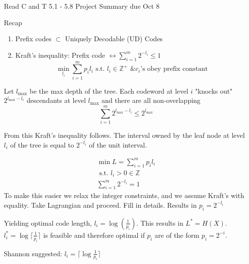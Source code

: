 

Read C and T 5.1 - 5.8
\noindent
Project Summary due Oct 8

\begin{rmk}{Recap}{}
\begin{enumerate}
    \item Prefix codes \(\subset \) Uniquely Decodable (UD) Codes
    \item Kraft's inequality: Prefix code \(\leftrightarrow \sum_{i = 1}^{m} 2^{- l_{i} }\leq 1\)
    \[
        \min _{l_{i} }\sum_{i = 1}^m p_{i} l_{i} \text{ s.t. } l_{i} \in \mathbb{Z}^+ \text{ \& } c_{i}\text{'s obey prefix constant} 
    \]
\end{enumerate}
\end{rmk}

Let \(l_{\mathrm{max} } \) be the max depth of the tree. Each codeword at level \(i\) "knocks out" \(2^{l_{\mathrm{max} } - l_{i} }\) descendants at level \(l_{\mathrm{max} } \) and there are all non-overlapping
\[
    \sum_{i = 1}^{m} 2^{l_{\mathrm{max} } - l_{i}  } \leq 2^{l_{\mathrm{max} } }
\]

From this Kraft's inequality follows. The interval owned by the leaf node at level \(l_{i}  \) of the tree is equal to \(2^{- l_{i} } \) of the unit interval. 



\begin{misc}{}{}
\begin{align*}
    \min  L = \sum_{i = 1}^{m} p _{i} l_{i} \\ \text{ s.t. } l_{i} > 0 \in \mathbb{Z} \\
    \sum_{i = 1}^{m} 2^{- l _{i} } = 1
\end{align*}
To make this easier we relax the integer constraints, and we assume Kraft's with equality. Take Lagrangian and proceed. Fill in details. Results in \(p_{i} = 2^{- l _{i} }\) 

Yielding optimal code length, \(l_{i} = \log (\frac{1}{p _{i} })\).  This results in \(L^{\ast} = H(X)\). \(l_{i} ^{\ast} = \log  \lceil \frac{1}{p _{i} } \rceil \) is feasible and therefore optimal if \(p _{i} \) are of the form \(p_{i} = 2^{-i} \). 
\end{misc}

Shannon suggested: \(l_{i} = \lceil \log \frac{1}{p _{i}  } \rceil \) 

